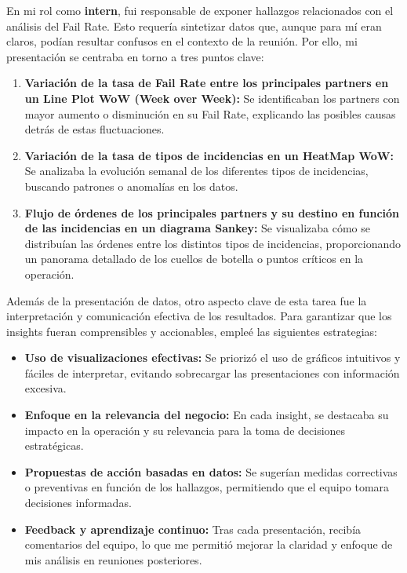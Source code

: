 En mi rol como \textbf{intern}, fui responsable de exponer hallazgos relacionados con el análisis del Fail Rate. Esto requería sintetizar datos que, aunque para mí eran claros, podían resultar confusos en el contexto de la reunión. Por ello, mi presentación se centraba en torno a tres puntos clave:

\begin{enumerate}
	\item \textbf{Variación de la tasa de Fail Rate entre los principales partners en un Line Plot WoW (Week over Week):} Se identificaban los partners con mayor aumento o disminución en su Fail Rate, explicando las posibles causas detrás de estas fluctuaciones.
	\item \textbf{Variación de la tasa de tipos de incidencias en un HeatMap WoW:} Se analizaba la evolución semanal de los diferentes tipos de incidencias, buscando patrones o anomalías en los datos.
	\item \textbf{Flujo de órdenes de los principales partners y su destino en función de las incidencias en un diagrama Sankey:} Se visualizaba cómo se distribuían las órdenes entre los distintos tipos de incidencias, proporcionando un panorama detallado de los cuellos de botella o puntos críticos en la operación.
\end{enumerate}

Además de la presentación de datos, otro aspecto clave de esta tarea fue la interpretación y comunicación efectiva de los resultados. Para garantizar que los insights fueran comprensibles y accionables, empleé las siguientes estrategias:

\begin{itemize}
	\item \textbf{Uso de visualizaciones efectivas:} Se priorizó el uso de gráficos intuitivos y fáciles de interpretar, evitando sobrecargar las presentaciones con información excesiva.
	\item \textbf{Enfoque en la relevancia del negocio:} En cada insight, se destacaba su impacto en la operación y su relevancia para la toma de decisiones estratégicas.
	\item \textbf{Propuestas de acción basadas en datos:} Se sugerían medidas correctivas o preventivas en función de los hallazgos, permitiendo que el equipo tomara decisiones informadas.
	\item \textbf{Feedback y aprendizaje continuo:} Tras cada presentación, recibía comentarios del equipo, lo que me permitió mejorar la claridad y enfoque de mis análisis en reuniones posteriores.
\end{itemize}

